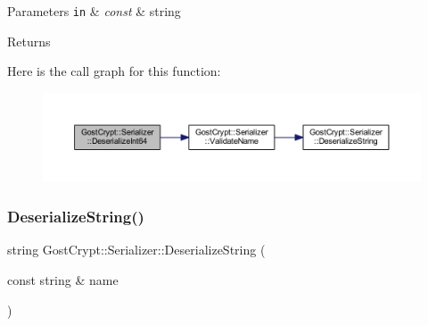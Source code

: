 \begin{DoxyParams}[1]{Parameters}
\mbox{\tt in}  & {\em const} & string \\
\hline
\end{DoxyParams}
\begin{DoxyReturn}{Returns}

\end{DoxyReturn}
Here is the call graph for this function\+:
\nopagebreak
\begin{figure}[H]
\begin{center}
\leavevmode
\includegraphics[width=350pt]{class_gost_crypt_1_1_serializer_afc8c758b68227ecc0b2abc8f8fb7d52d_cgraph}
\end{center}
\end{figure}
\mbox{\label{class_gost_crypt_1_1_serializer_afc4e689cfaf89809fd729c1ec2a8ec8a}} 
\subsubsection{\texorpdfstring{Deserialize\+String()}{DeserializeString()}\hspace{0.1cm}{\footnotesize\ttfamily [1/2]}}
{\footnotesize\ttfamily string Gost\+Crypt\+::\+Serializer\+::\+Deserialize\+String (\begin{DoxyParamCaption}\item[{const string \&}]{name }\end{DoxyParamCaption})}


